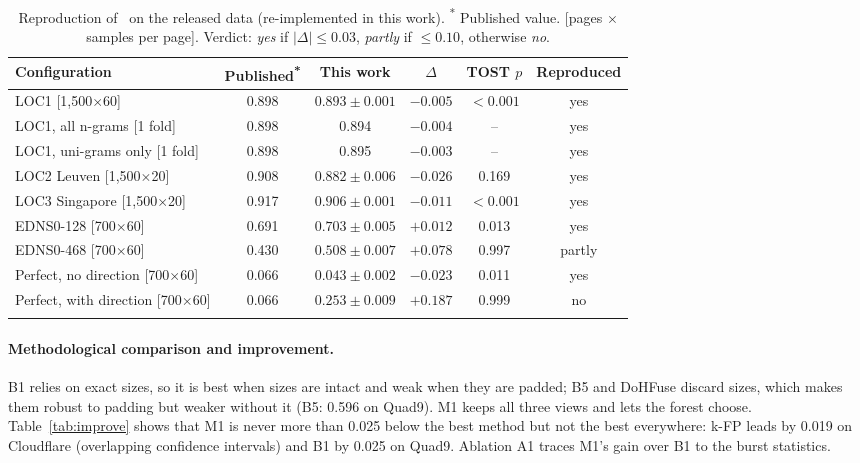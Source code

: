\documentclass[pdflatex,sn-mathphys-num]{sn-jnl}
\newcommand{\pub}{\textsuperscript{*}}
\begin{document}
\begin{table}[t]
\caption{Reproduction of~\cite{siby2020} on the released data (re-implemented in this work). \pub{} Published value. [pages $\times$ samples per page]. Verdict: \emph{yes} if $|\Delta|\le0.03$, \emph{partly} if $\le0.10$, otherwise \emph{no}.}\label{tab:repro}
\scriptsize\setlength{\tabcolsep}{2pt}
\begin{tabular*}{\textwidth}{@{\extracolsep\fill}lccccc@{}}
\toprule
Configuration & Published\pub{} & This work & $\Delta$ & TOST $p$ & Reproduced \\
\midrule
LOC1 [1,500$\times$60] & 0.898 & $0.893\pm0.001$ & $-0.005$ & $<0.001$ & yes \\
LOC1, all n-grams [1 fold] & 0.898 & 0.894 & $-0.004$ & -- & yes \\
LOC1, uni-grams only [1 fold] & 0.898 & 0.895 & $-0.003$ & -- & yes \\
LOC2 Leuven [1,500$\times$20] & 0.908 & $0.882\pm0.006$ & $-0.026$ & 0.169 & yes \\
LOC3 Singapore [1,500$\times$20] & 0.917 & $0.906\pm0.001$ & $-0.011$ & $<0.001$ & yes \\
EDNS0-128 [700$\times$60] & 0.691 & $0.703\pm0.005$ & $+0.012$ & 0.013 & yes \\
EDNS0-468 [700$\times$60] & 0.430 & $0.508\pm0.007$ & $+0.078$ & 0.997 & partly \\
Perfect, no direction [700$\times$60] & 0.066 & $0.043\pm0.002$ & $-0.023$ & 0.011 & yes \\
Perfect, with direction [700$\times$60] & 0.066 & $0.253\pm0.009$ & $+0.187$ & 0.999 & no \\
\botrule
\end{tabular*}
\end{table}

\paragraph{Methodological comparison and improvement.} B1 relies on exact sizes, so it is best when sizes are intact and weak when they are padded; B5 and DoHFuse discard sizes, which makes them robust to padding but weaker without it (B5: 0.596 on Quad9). M1 keeps all three views and lets the forest choose. Table~\ref{tab:improve} shows that M1 is never more than 0.025 below the best method but not the best everywhere: k-FP leads by 0.019 on Cloudflare (overlapping confidence intervals) and B1 by 0.025 on Quad9. Ablation A1 traces M1's gain over B1 to the burst statistics.
\end{document}
